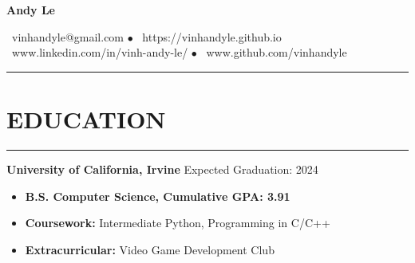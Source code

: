 \documentclass{article}
\begin{document}
   \begin{center}
      \Huge\textbf{Andy Le}\\
      \vspace{3pt}

      \normalsize{\faEnvelope\ vinhandyle@gmail.com} $\bullet$
      \normalsize{\faHome\ https://vinhandyle.github.io}\\

      \vspace{3pt}
      \normalsize{\faLinkedinSquare\ www.linkedin.com/in/vinh-andy-le/} $\bullet$
      \normalsize{\faGithubSquare\ www.github.com/vinhandyle}
   \end{center}
\vspace{-5pt} \hrule \vspace{-5pt}

\section*{EDUCATION} \vspace{-6pt} \hrule \vspace{6pt}
\textbf{University of California, Irvine} \hfill Expected Graduation: 2024
\begin{itemize}
	\item\vspace{-6pt} \textbf{B.S. Computer Science, Cumulative GPA: 3.91}
	\item\vspace{-6pt}\textbf{Coursework:} Intermediate Python, Programming in C/C++
	\item\vspace{-6pt}\textbf{Extracurricular:} Video Game Development Club
\end{itemize}
\vspace{-20pt}
\end{document}
